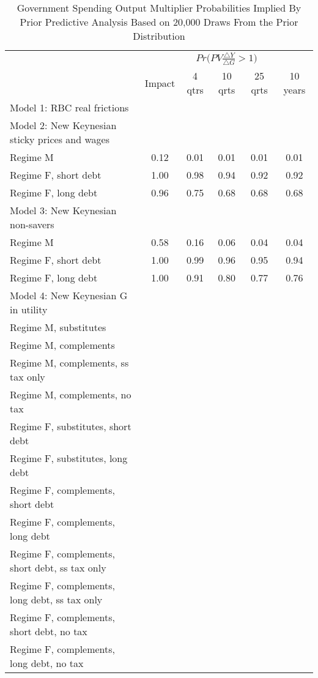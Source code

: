 \documentclass[letterpaper,12pt]{article}%
\begin{document}
\begin{table}[H]
    \centering
    \caption{Government Spending Output Multiplier Probabilities Implied By Prior Predictive Analysis Based on 20,000 Draws From the Prior Distribution}
    \begin{tabular}{l c c c c c}
    \toprule
        & \multicolumn{5}{c}{$Pr\Big(PV \frac{\triangle Y}{\triangle G}>1\Big)$}\\
      \cmidrule{2-6}
        & Impact & 4 qtrs & 10 qrts & 25 qrts & 10 years \\
       \midrule
     Model 1: RBC real frictions &    &   &   &   &  \\
     Model 2: New Keynesian sticky prices and wages  &    &   &   &   &       \\
     \quad Regime M & 0.12 & 0.01 & 0.01 & 0.01 & 0.01  \\
     \quad Regime F, short debt & 1.00 &  0.98  & 0.94 & 0.92  & 0.92  \\
     \quad Regime F, long debt &  0.96 & 0.75 & 0.68 &  0.68  & 0.68  \\
     Model 3: New Keynesian non-savers &    &   &   &   &  \\
     \quad Regime M &   0.58 & 0.16 & 0.06  & 0.04 & 0.04 \\
     \quad Regime F, short debt &  1.00 &  0.99  & 0.96 & 0.95  & 0.94 \\
     \quad Regime F, long debt &   1.00 & 0.91 & 0.80 & 0.77  & 0.76 \\
     Model 4: New Keynesian G in utility &    &   &   &   &  \\
     \quad Regime M, substitutes &    &   &   &   &  \\
     \quad Regime M, complements &    &   &   &   &  \\
     \quad Regime M, complements, ss tax only &    &   &   &   &  \\
     \quad Regime M, complements, no tax &    &   &   &   &  \\
     \quad Regime F, substitutes, short debt &    &   &   &   &  \\
     \quad Regime F, substitutes, long debt &    &   &   &   &  \\
     \quad Regime F, complements, short debt &    &   &   &   &  \\
     \quad Regime F, complements, long debt &    &   &   &   &  \\
     \quad Regime F, complements, short debt, ss tax only &    &   &   &   &  \\
     \quad Regime F, complements, long debt, ss tax only &    &   &   &   &  \\
     \quad Regime F, complements, short debt, no tax &    &   &   &   &  \\
     \quad Regime F, complements, long debt, no tax &    &   &   &   &  \\
     \midrule
    \bottomrule    
    \end{tabular}
    \label{tab:PPAOutputMultipliers}
\end{table}
\end{document}
